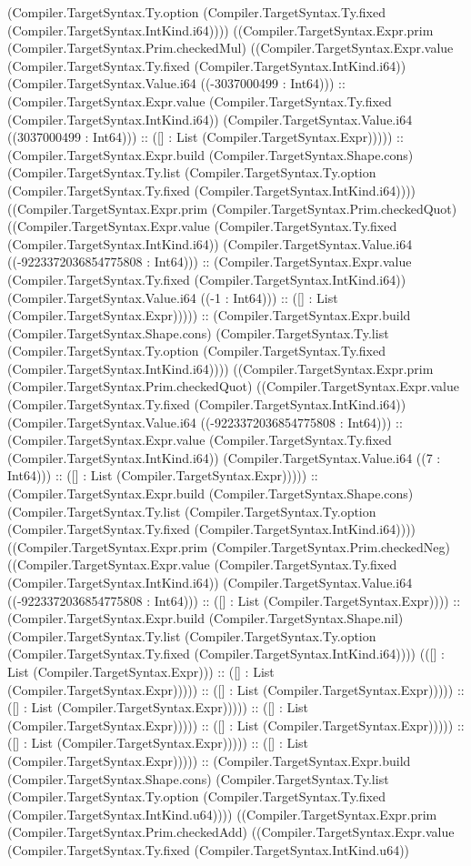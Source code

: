 \documentclass[11pt]{article}
\begin{document}
(Compiler.TargetSyntax.Ty.option (Compiler.TargetSyntax.Ty.fixed (Compiler.TargetSyntax.IntKind.i64)))) ((Compiler.TargetSyntax.Expr.prim (Compiler.TargetSyntax.Prim.checkedMul) ((Compiler.TargetSyntax.Expr.value (Compiler.TargetSyntax.Ty.fixed (Compiler.TargetSyntax.IntKind.i64)) (Compiler.TargetSyntax.Value.i64 ((-3037000499 : Int64))) :: (Compiler.TargetSyntax.Expr.value (Compiler.TargetSyntax.Ty.fixed (Compiler.TargetSyntax.IntKind.i64)) (Compiler.TargetSyntax.Value.i64 ((3037000499 : Int64))) :: ([] : List (Compiler.TargetSyntax.Expr))))) :: (Compiler.TargetSyntax.Expr.build (Compiler.TargetSyntax.Shape.cons) (Compiler.TargetSyntax.Ty.list (Compiler.TargetSyntax.Ty.option (Compiler.TargetSyntax.Ty.fixed (Compiler.TargetSyntax.IntKind.i64)))) ((Compiler.TargetSyntax.Expr.prim (Compiler.TargetSyntax.Prim.checkedQuot) ((Compiler.TargetSyntax.Expr.value (Compiler.TargetSyntax.Ty.fixed (Compiler.TargetSyntax.IntKind.i64)) (Compiler.TargetSyntax.Value.i64 ((-9223372036854775808 : Int64))) :: (Compiler.TargetSyntax.Expr.value (Compiler.TargetSyntax.Ty.fixed (Compiler.TargetSyntax.IntKind.i64)) (Compiler.TargetSyntax.Value.i64 ((-1 : Int64))) :: ([] : List (Compiler.TargetSyntax.Expr))))) :: (Compiler.TargetSyntax.Expr.build (Compiler.TargetSyntax.Shape.cons) (Compiler.TargetSyntax.Ty.list (Compiler.TargetSyntax.Ty.option (Compiler.TargetSyntax.Ty.fixed (Compiler.TargetSyntax.IntKind.i64)))) ((Compiler.TargetSyntax.Expr.prim (Compiler.TargetSyntax.Prim.checkedQuot) ((Compiler.TargetSyntax.Expr.value (Compiler.TargetSyntax.Ty.fixed (Compiler.TargetSyntax.IntKind.i64)) (Compiler.TargetSyntax.Value.i64 ((-9223372036854775808 : Int64))) :: (Compiler.TargetSyntax.Expr.value (Compiler.TargetSyntax.Ty.fixed (Compiler.TargetSyntax.IntKind.i64)) (Compiler.TargetSyntax.Value.i64 ((7 : Int64))) :: ([] : List (Compiler.TargetSyntax.Expr))))) :: (Compiler.TargetSyntax.Expr.build (Compiler.TargetSyntax.Shape.cons) (Compiler.TargetSyntax.Ty.list (Compiler.TargetSyntax.Ty.option (Compiler.TargetSyntax.Ty.fixed (Compiler.TargetSyntax.IntKind.i64)))) ((Compiler.TargetSyntax.Expr.prim (Compiler.TargetSyntax.Prim.checkedNeg) ((Compiler.TargetSyntax.Expr.value (Compiler.TargetSyntax.Ty.fixed (Compiler.TargetSyntax.IntKind.i64)) (Compiler.TargetSyntax.Value.i64 ((-9223372036854775808 : Int64))) :: ([] : List (Compiler.TargetSyntax.Expr)))) :: (Compiler.TargetSyntax.Expr.build (Compiler.TargetSyntax.Shape.nil) (Compiler.TargetSyntax.Ty.list (Compiler.TargetSyntax.Ty.option (Compiler.TargetSyntax.Ty.fixed (Compiler.TargetSyntax.IntKind.i64)))) (([] : List (Compiler.TargetSyntax.Expr))) :: ([] : List (Compiler.TargetSyntax.Expr))))) :: ([] : List (Compiler.TargetSyntax.Expr))))) :: ([] : List (Compiler.TargetSyntax.Expr))))) :: ([] : List (Compiler.TargetSyntax.Expr))))) :: ([] : List (Compiler.TargetSyntax.Expr))))) :: ([] : List (Compiler.TargetSyntax.Expr))))) :: ([] : List (Compiler.TargetSyntax.Expr))))) :: (Compiler.TargetSyntax.Expr.build (Compiler.TargetSyntax.Shape.cons) (Compiler.TargetSyntax.Ty.list (Compiler.TargetSyntax.Ty.option (Compiler.TargetSyntax.Ty.fixed (Compiler.TargetSyntax.IntKind.u64)))) ((Compiler.TargetSyntax.Expr.prim (Compiler.TargetSyntax.Prim.checkedAdd) ((Compiler.TargetSyntax.Expr.value (Compiler.TargetSyntax.Ty.fixed (Compiler.TargetSyntax.IntKind.u64)) 
\end{document}
